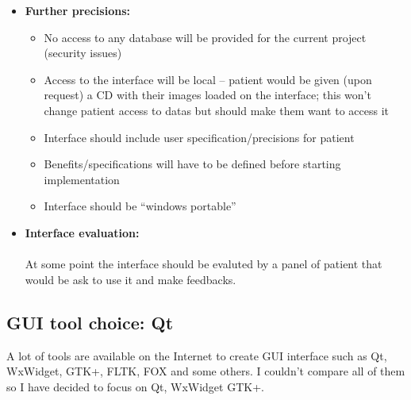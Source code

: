 \documentclass[12pt,twoside]{article}
\begin{document}
\begin{itemize}
\begin{itemize}
\end{itemize}

\item \textbf{Further precisions:}
\begin{itemize}
\item No access to any database will be provided for the current project (security issues) 
\item Access to the interface will be local – patient would be given (upon request) a CD with their images loaded on the interface; this won’t change patient access to datas but should make them want to access it
\item Interface should include user specification/precisions for patient 
\item Benefits/specifications will have to be defined before starting implementation
\item Interface should be “windows portable” 
\end{itemize}

\item \textbf{Interface evaluation:} \\ \\
At some point the interface should be evaluted by a panel of patient that would be ask to use it and make feedbacks.


\end{itemize}

\clearpage


\subsection{GUI tool choice: Qt}
A lot of tools are available on the Internet to create GUI interface such as Qt, WxWidget, GTK+, FLTK, FOX and some others. I couldn't compare all of them so I have decided to focus on Qt, WxWidget GTK+.
\end{document}

